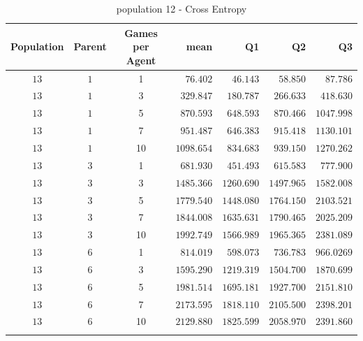 \begin{table}[H]
\centering
\small
\begin{tabular}{c c c r r r r}
Population & Parent & Games per Agent & mean & Q1 & Q2 & Q3\\
\hline
$13$ & $1$ & 1 & $76.402$ & $46.143$ & $58.850$ & $87.786$\\
$13$ & $1$ & 3 & $329.847$ & $180.787$ & $266.633$ & $418.630$\\
$13$ & $1$ & 5 & $870.593$ & $648.593$ & $870.466$ & $1047.998$\\
$13$ & $1$ & 7 & $951.487$ & $646.383$ & $915.418$ & $1130.101$\\
\hdashline
$13$ & $1$ & 10 & $1098.654$ & $834.683$ & $939.150$ & $1270.262$\\
\hdashline
$13$ & $3$ & 1 & $681.930$ & $451.493$ & $615.583$ & $777.900$\\
$13$ & $3$ & 3 & $1485.366$ & $1260.690$ & $1497.965$ & $1582.008$\\
$13$ & $3$ & 5 & $1779.540$ & $1448.080$ & $1764.150$ & $2103.521$\\
$13$ & $3$ & 7 & $1844.008$ & $1635.631$ & $1790.465$ & $2025.209$\\
\hdashline
$13$ & $3$ & 10 & $1992.749$ & $1566.989$ & $1965.365$ & $2381.089$\\
\hdashline
$13$ & $6$ & 1 & $814.019$ & $598.073$ & $736.783$ & $966.0269$\\
$13$ & $6$ & 3 & $1595.290$ & $1219.319$ & $1504.700$ & $1870.699$\\
$13$ & $6$ & 5 & $1981.514$ & $1695.181$ & $1927.700$ & $2151.810$\\
\hdashline
$13$ & $6$ & 7 & $2173.595$ & $1818.110$ & $2105.500$ & $2398.201$\\
\hdashline
$13$ & $6$ & 10 & $2129.880$ & $1825.599$ & $2058.970$ & $2391.860$\\
\hdashline
\end{tabular}
\caption{population 12 - Cross Entropy}
\end{table}

